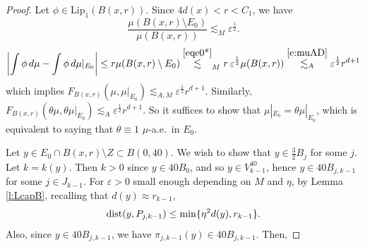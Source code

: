 \documentclass[11pt]{amsart}
\newcommand{\LL}{{\mathcal L}}
\newcommand{\dist}{{\rm dist}}
\newcommand{\ve}{{\varepsilon}}
\theoremstyle{definition}
\theoremstyle{remark}
\numberwithin{equation}{section}
\newcommand{\av}[1]{\left| #1 \right|}
\def\lec{\lesssim}
\def\lec{\lesssim}
\def\Lip{\textrm{Lip}}
\begin{document}
\begin{proof}
	Let $\phi\in \Lip_{1}(B(x,r))$. Since $4d(x)<r< C_1$, we have
	$$\frac{\mu(B(x,r)\setminus E_{0})}{ \mu(B(x,r))}\lesssim_{M}\ve^{\frac{1}{2}}.
$$ 
	\[
	\av{\int \phi\, d\mu - \int \phi\, d\mu|_{E_{0}}}
	\leq r\mu(B(x,r)\setminus E_{0})
	\stackrel{\eqref{eqe0*}}{\lesssim}_M r\,\ve^{\frac{1}{2}} \mu(B(x,r))\stackrel{\eqref{e:muAD}}{\lec_{A}} \ve^{\frac{1}{2}} r^{d+1} 
	\]
	which implies $F_{B(x,r)} (\mu, \mu|_{E_{0}})\lec_{A,M} \ve^{\frac{1}{2}} r^{d+1}$. Similarly, $F_{B(x,r)}  (\theta \mu, \theta \mu|_{E_{0}})\lec_{A} \ve^{\frac{1}{2}} r^{d+1}$. So it suffices to show
	that $\mu|_{E_{0}}=\theta \mu|_{E_{0}}$, which is equivalent to saying that $\theta\equiv1$ 
	$\mu$-a.e.\ in $E_0$. 
	
	
	Let $y\in E_{0}\cap B(x,r)\setminus Z\subset B(0,40)$. We wish to show that $y\in\frac32 B_j$ for
	some $j$.
	Let $k=k(y)$. Then $k>0$ since $y\in 40 B_{0}$, and so $y\in V_{k-1}^{40}$, hence $y\in 40B_{j,k-1}$ for some $j\in J_{k-1}$. 
%	
%	
%	
%	
	For $\ve>0$ small enough  depending on $M$ and $\eta$, by Lemma \ref{l:LcapB}, 
	recalling that $d(y)\approx r_{k-1}$,
		\[
	\dist(y,P_{j,k-1})\leq \min\{\eta^{2}d(y),r_{k-1}\}.
	\]
	Also, since $y\in 40 B_{j,k-1}$, we have
	$
	\pi_{j,k-1}(y) \in 40B_{j,k-1}$. Then,

\end{proof}
\end{document}
